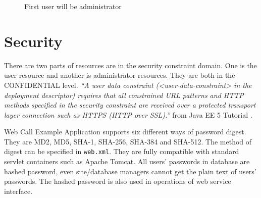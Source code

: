 \begin{figure}[!hbtp]
\centering
{}
\caption{First user will be administrator}
\label{fig:FirstUser}
\end{figure} 

\section{Security}
\label{sec:WebApplication:Security}

There are two parts of resources are in the security constraint domain. One is the user resource and another is administrator resources. They are both in the CONFIDENTIAL level. \textit{``A user data constraint (<user-data-constraint> in the deployment descriptor) requires that all constrained URL patterns and HTTP methods specified in the security constraint are received over a protected transport layer connection such as HTTPS (HTTP over SSL).''} from Java EE 5 Tutorial \cite{JavaEE5Tutorial}.  

Web Call Example Application supports six different ways of password digest. They are MD2, MD5, SHA-1, SHA-256, SHA-384 and SHA-512. The method of digest can be specified in \texttt{web.xml}. They are fully compatible with standard servlet containers such as \textsf{Apache Tomcat}. All users' passwords in database are hashed password, even site/database managers cannot get the plain text of users' passwords. The hashed password is also used in operations of web service interface. 


